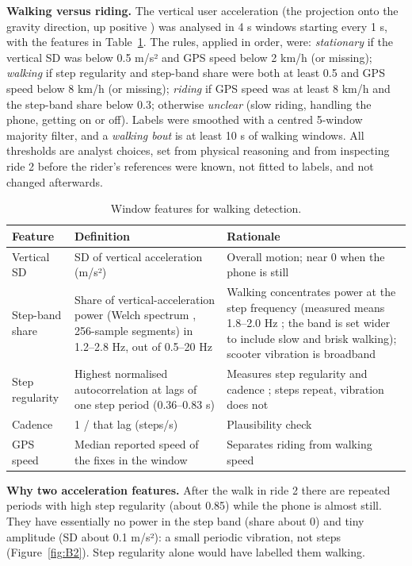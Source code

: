 \textbf{Walking versus riding.} The vertical user acceleration (the projection onto the
gravity direction, up positive \autocite{mizell2003}) was analysed in 4 s windows starting
every 1 s, with the features in Table~\ref{tab:Bfeat}. The rules, applied in order, were:
\emph{stationary} if the vertical SD was below 0.5 m/s² and GPS speed below 2 km/h (or
missing); \emph{walking} if step regularity and step-band share were both at least 0.5 and
GPS speed below 8 km/h (or missing); \emph{riding} if GPS speed was at least 8 km/h and the
step-band share below 0.3; otherwise \emph{unclear} (slow riding, handling the phone,
getting on or off). Labels were smoothed with a centred 5-window majority filter, and a
\emph{walking bout} is at least 10 s of walking windows. All thresholds are analyst choices,
set from physical reasoning and from inspecting ride 2 before the rider's references were
known, not fitted to labels, and not changed afterwards.

\begin{table}[htbp]
\centering\small
\caption{Window features for walking detection.}\label{tab:Bfeat}
\begin{tabular}{@{}p{26mm}p{60mm}p{66mm}@{}}
\toprule
Feature & Definition & Rationale \\
\midrule
Vertical SD & SD of vertical acceleration (m/s²) & Overall motion; near 0 when the phone is still \\
Step-band share & Share of vertical-acceleration power (Welch spectrum \autocite{welch1967}, 256-sample segments) in 1.2--2.8 Hz, out of 0.5--20 Hz & Walking concentrates power at the step frequency (measured means 1.8--2.0 Hz \autocite{pachi2005}; the band is set wider to include slow and brisk walking); scooter vibration is broadband \\
Step regularity & Highest normalised autocorrelation at lags of one step period (0.36--0.83 s) & Measures step regularity and cadence \autocite{moenilssen2004}; steps repeat, vibration does not \\
Cadence & 1 / that lag (steps/s) & Plausibility check \\
GPS speed & Median reported speed of the fixes in the window & Separates riding from walking speed \\
\bottomrule
\end{tabular}
\end{table}

\textbf{Why two acceleration features.} After the walk in ride 2 there are repeated
periods with high step regularity (about 0.85) while the phone is almost still. They have
essentially no power in the step band (share about 0) and tiny amplitude (SD about
0.1 m/s²): a small periodic vibration, not steps (Figure~\ref{fig:B2}). Step regularity
alone would have labelled them walking.

